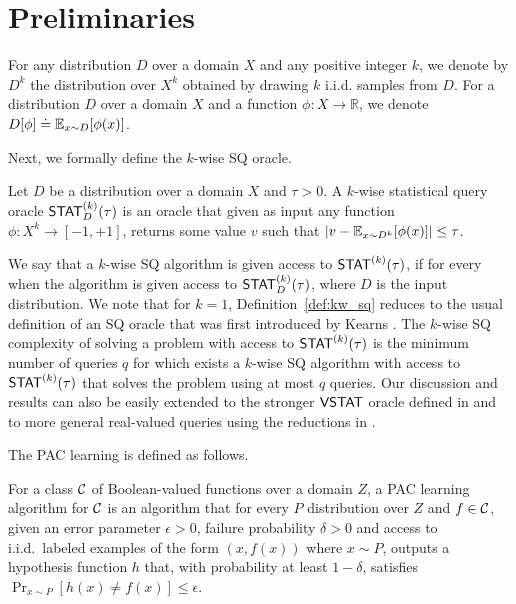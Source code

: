 \section{Preliminaries}
For any distribution $D$ over a domain $X$ and any positive integer $k$, we denote by $D^k$ the distribution over $X^k$ obtained by drawing $k$ i.i.d. samples from $D$. For a distribution $D$ over a domain $X$ and a function $\phi: X \to \mathbb{R}$, we denote $D[\phi] \doteq \mathbb E_{x \sim D}[\phi(x)]$.


Next, we formally define the $k$-wise SQ oracle.

\begin{defn}\label{def:kw_sq}
Let $D$ be a distribution over a domain $X$ and $\tau > 0$. A $k$-wise statistical query oracle $\mathsf{STAT}^{(k)}_D(\tau)$ is an oracle that given as input any function $\phi:X^k \to [-1,+1]$, returns some value $v$ such that $|v-\mathbb E_{x \sim D^k}[\phi(x)]| \le \tau$.
\end{defn}

We say that a $k$-wise SQ algorithm is given access to $\mathsf{STAT}^{(k)}(\tau)$, if for every when the algorithm is given access to  $\mathsf{STAT}^{(k)}_D(\tau)$, where $D$ is the input distribution. We note that for $k = 1$, Definition~\ref{def:kw_sq} reduces to the usual definition of an SQ oracle that was first introduced by Kearns \cite{kearns1998efficient}. %
The $k$-wise SQ complexity of solving a problem with access to $\mathsf{STAT}^{(k)}(\tau)$  is the minimum number of queries $q$ for which exists a $k$-wise SQ algorithm with access to $\mathsf{STAT}^{(k)}(\tau)$ that solves the problem using at most $q$ queries. Our discussion and results can also be easily extended to the stronger $\mathsf{VSTAT}$ oracle defined in \cite{FeldmanGRVX:12} and to more general real-valued queries using the reductions in \cite{Feldman:16sqvar}.

The PAC learning \cite{valiant1984theory} is defined as follows.
\begin{defn}
For a class $\mathcal{C}$ of Boolean-valued functions over a domain $Z$, a PAC learning algorithm for $\mathcal{C}$ is an algorithm that for every $P$ distribution over $Z$ and $f \in \mathcal{C}$, given an error parameter $\epsilon > 0$, failure probability $\delta > 0$ and access to i.i.d.~labeled examples of the form $(x,f(x))$ where $x \sim P$, outputs a hypothesis function $h$ that, with probability at least $1-\delta$, satisfies $\Pr_{x \sim P}[h(x) \neq f(x)] \le \epsilon$.
\end{defn}

